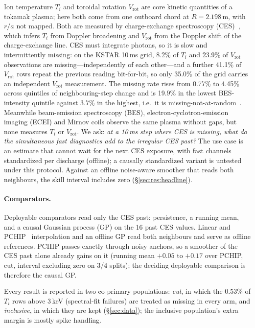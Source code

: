 \documentclass[10pt,twocolumn,letterpaper]{article}
\newcommand{\Ti}{\ensuremath{T_i}}
\newcommand{\Vrot}{\ensuremath{V_\mathrm{rot}}}
\begin{document}
Ion temperature \Ti{} and toroidal rotation \Vrot{} are core kinetic quantities of a
tokamak plasma; here both come from one outboard chord at $R = 2.198$\,m, with $r/a$
not mapped. Both are measured by charge-exchange
spectroscopy (CES)~\citep{Ko2010ChargeExchange}, which infers \Ti{} from Doppler
broadening and \Vrot{} from the Doppler shift of the charge-exchange line. CES must
integrate photons, so it is slow and intermittently missing: on the KSTAR 10\,ms grid,
8.2\% of \Ti{} and 23.9\% of \Vrot{} observations are missing---independently of each
other---and a further 41.1\% of \Vrot{} rows repeat the previous reading
bit-for-bit, so only 35.0\% of the grid carries an independent \Vrot{} measurement.
The missing rate rises from 0.77\% to 4.45\% across quintiles of neighbouring-step
change and is 19.9\% in the lowest BES-intensity quintile against 3.7\% in the highest,
i.e.\ it is missing-not-at-random~\citep{Little2002StatisticalAnalysis}. Meanwhile
beam-emission spectroscopy (BES), electron-cyclotron-emission imaging (ECEI) and
Mirnov coils observe the same plasma without gaps, but none measures \Ti{} or \Vrot{}.
We ask: \emph{at a 10\,ms step where CES is missing, what do the simultaneous fast
diagnostics add to the irregular CES past?} The use case is an estimate that cannot
wait for the next CES exposure, with fast channels standardized per discharge (offline);
a causally standardized variant is untested under this protocol. Against an offline
noise-aware smoother that reads both neighbours, the skill interval includes zero
(\S\ref{sec:res:headline}).

\paragraph{Comparators.}
Deployable comparators read only the CES past: persistence, a running mean, and a causal
Gaussian process (GP) on the 16 past CES values. Linear and
PCHIP~\citep{fritsch1980} interpolation and an offline GP read both neighbours and serve
as offline references. PCHIP passes exactly through noisy anchors, so a smoother of the
CES past alone already gains on it (running mean $+0.05$ to $+0.17$ over PCHIP, cut,
interval excluding zero on 3/4 splits); the deciding deployable comparison is therefore
the causal GP.

Every result is reported in two co-primary populations: \emph{cut}, in which the
0.53\% of \Ti{} rows above 3\,keV (spectral-fit failures) are treated as missing in
every arm, and \emph{inclusive}, in which they are kept (\S\ref{sec:data}); the
inclusive population's extra margin is mostly spike handling.
\end{document}
